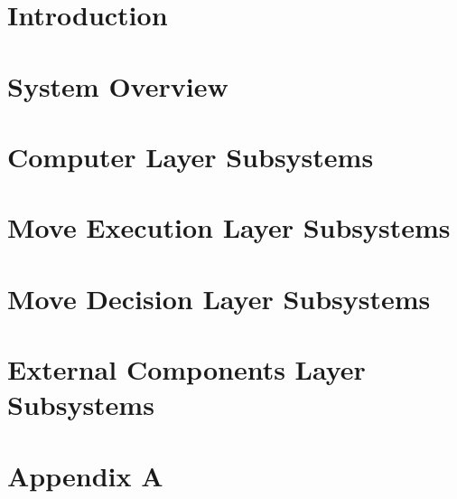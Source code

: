 \documentclass[11pt,letterpaper]{article}
\begin{document}
\section{Introduction}

\section{System Overview}

\newpage
%
\newpage
% 
% 
% 
\section{Computer Layer Subsystems}

\newpage
\section{Move Execution Layer Subsystems}

\newpage
\section{Move Decision Layer Subsystems}

\newpage
\section{External Components Layer Subsystems}

\newpage
\section{Appendix A}

\newpage

% 
% 
\end{document}
